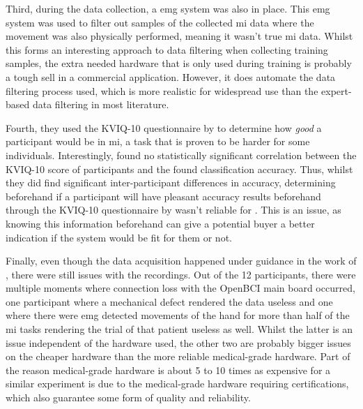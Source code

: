 Third, during the data collection, a \gls{emg} system was also in place.
This \gls{emg} system was used to filter out samples of the collected \gls{mi} data where the movement was also physically performed, meaning it wasn't true \gls{mi} data.
Whilst this forms an interesting approach to data filtering when collecting training samples, the extra needed hardware that is only used during training is probably a tough sell in a commercial application.
However, it does automate the data filtering process used, which is more realistic for widespread use than the expert-based data filtering in most literature. 

Fourth, they used the KVIQ-10 questionnaire by \citet{kviq} to determine how \textit{good} a participant would be in \gls{mi}, a task that is proven to be harder for some individuals.
Interestingly, \citet{cheap_bci_feasibility} found no statistically significant correlation between the KVIQ-10 score of participants and the found classification accuracy.
Thus, whilst they did find significant inter-participant differences in accuracy, determining beforehand if a participant will have pleasant accuracy results beforehand through the KVIQ-10 questionnaire by \citet{kviq} wasn't reliable for \citet{cheap_bci_feasibility}.
This is an issue, as knowing this information beforehand can give a potential buyer a better indication if the system would be fit for them or not.

Finally, even though the data acquisition happened under guidance in the work of \citet{cheap_bci_feasibility}, there were still issues with the recordings.
Out of the 12 participants, there were multiple moments where connection loss with the OpenBCI main board occurred, one participant where a mechanical defect rendered the data useless and one where there were \gls{emg} detected movements of the hand for more than half of the \gls{mi} tasks rendering the trial of that patient useless as well.
Whilst the latter is an issue independent of the hardware used, the other two are probably bigger issues on the cheaper hardware than the more reliable medical-grade hardware.
Part of the reason medical-grade hardware is about 5 to 10 times as expensive for a similar experiment is due to the medical-grade hardware requiring certifications, which also guarantee some form of quality and reliability. 

